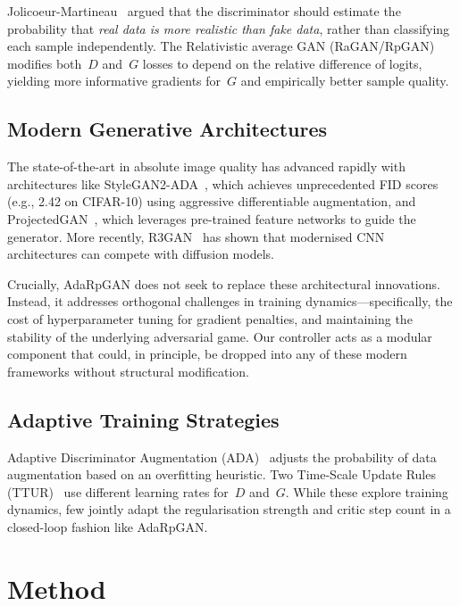 \documentclass[journal]{IEEEtran}
\begin{document}
Jolicoeur-Martineau~\cite{jolicoeur2019relativistic} argued that the discriminator should estimate the probability that \emph{real data is more realistic than fake data}, rather than classifying each sample independently. The Relativistic average GAN (RaGAN/RpGAN) modifies both~$D$ and~$G$ losses to depend on the relative difference of logits, yielding more informative gradients for~$G$ and empirically better sample quality.

\subsection{Modern Generative Architectures}

The state-of-the-art in absolute image quality has advanced rapidly with architectures like StyleGAN2-ADA~\cite{karras2020training}, which achieves unprecedented FID scores (e.g., 2.42 on CIFAR-10) using aggressive differentiable augmentation, and ProjectedGAN~\cite{sauer2021projected}, which leverages pre-trained feature networks to guide the generator. More recently, R3GAN~\cite{kancharla2025r3gan} has shown that modernised CNN architectures can compete with diffusion models.

Crucially, AdaRpGAN does not seek to replace these architectural innovations. Instead, it addresses orthogonal challenges in training dynamics---specifically, the cost of hyperparameter tuning for gradient penalties, and maintaining the stability of the underlying adversarial game. Our controller acts as a modular component that could, in principle, be dropped into any of these modern frameworks without structural modification.

\subsection{Adaptive Training Strategies}

Adaptive Discriminator Augmentation (ADA)~\cite{karras2020training} adjusts the probability of data augmentation based on an overfitting heuristic. Two Time-Scale Update Rules (TTUR)~\cite{heusel2017gans} use different learning rates for~$D$ and~$G$. While these explore training dynamics, few jointly adapt the regularisation strength and critic step count in a closed-loop fashion like AdaRpGAN.

\section{Method}
\label{sec:method}
\end{document}
